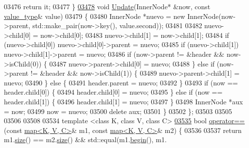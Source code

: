 \begin{DoxyCode}
03476             \textcolor{keywordflow}{return} it;
03477         \}
\hypertarget{map_8h_source.tex_l03478}{}\hyperlink{classaed2_1_1map_ad56871b0800aa1ba7df2eef904a35743_ad56871b0800aa1ba7df2eef904a35743}{03478}         \textcolor{keywordtype}{void} \hyperlink{classaed2_1_1map_ad56871b0800aa1ba7df2eef904a35743_ad56871b0800aa1ba7df2eef904a35743}{Update}(InnerNode* &now, \textcolor{keyword}{const} \hyperlink{classaed2_1_1map_a719db98e0ff9a837610f76be33264680_a719db98e0ff9a837610f76be33264680}{value\_type}& value)
03479         \{
03480             InnerNode *nuevo = \textcolor{keyword}{new} InnerNode(now->parent, std::make\_pair(now->key(), value.second));
03481 
03482             nuevo->child[0] = now->child[0];
03483             nuevo->child[1] = now->child[1];
03484             \textcolor{keywordflow}{if} (nuevo->child[0]) nuevo->child[0]->parent = nuevo;
03485             \textcolor{keywordflow}{if} (nuevo->child[1]) nuevo->child[1]->parent = nuevo;
03486             \textcolor{keywordflow}{if} (now->parent != &header && now->isChild(0)) \{
03487                 nuevo->parent->child[0] = nuevo;
03488             \} \textcolor{keywordflow}{else} \textcolor{keywordflow}{if} (now->parent != &header && now->isChild(1)) \{
03489                 nuevo->parent->child[1] = nuevo;
03490             \} \textcolor{keywordflow}{else} \{
03491                 header.parent = nuevo;
03492             \}
03493             \textcolor{keywordflow}{if} (now == header.child[0]) \{
03494                 header.child[0] = nuevo;
03495             \} \textcolor{keywordflow}{else} \textcolor{keywordflow}{if} (now == header.child[1]) \{
03496                 header.child[1] = nuevo;
03497             \}
03498             InnerNode *aux = now;
03499             now = nuevo;
03500             \textcolor{keyword}{delete} aux;
03501         \}
03502     \};
03503 
03505 
03506 
03508 
03534     \textcolor{keyword}{template} <\textcolor{keyword}{class} K, \textcolor{keyword}{class} V, \textcolor{keyword}{class} C>
\hypertarget{map_8h_source.tex_l03535}{}\hyperlink{classaed2_1_1map_abfc51b39670220e79037ac067006e933_abfc51b39670220e79037ac067006e933}{03535}     \textcolor{keywordtype}{bool} \hyperlink{classaed2_1_1map_abfc51b39670220e79037ac067006e933_abfc51b39670220e79037ac067006e933}{operator==}(\textcolor{keyword}{const} \hyperlink{classaed2_1_1map}{map<K, V, C>}& m1, \textcolor{keyword}{const} 
      \hyperlink{classaed2_1_1map}{map<K, V, C>}& m2) \{
03536 
03537         \textcolor{keywordflow}{return} m1.\hyperlink{classaed2_1_1map_a89f2613f926ac13293eafe65889d6021_a89f2613f926ac13293eafe65889d6021}{size}() == m2.\hyperlink{classaed2_1_1map_a89f2613f926ac13293eafe65889d6021_a89f2613f926ac13293eafe65889d6021}{size}() && std::equal(m1.\hyperlink{classaed2_1_1map_a58a95705d54b3dda7f775ce5a22225cb_a58a95705d54b3dda7f775ce5a22225cb}{begin}(), m1.

\end{DoxyCode}
